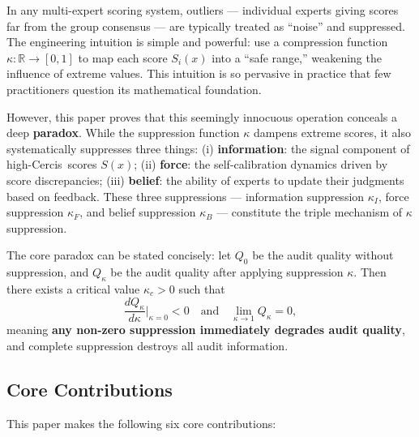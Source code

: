 \documentclass[12pt,a4paper]{article}
\theoremstyle{definition}
\newcommand{\R}{\mathbb{R}}
\newcommand{\Cercis}{\textsf{Cercis}}
\begin{document}
In any multi-expert scoring system, outliers --- individual experts giving scores far from the group consensus --- are typically treated as ``noise'' and suppressed. The engineering intuition is simple and powerful: use a compression function $\kappa: \R \to [0,1]$ to map each score $S_i(x)$ into a ``safe range,'' weakening the influence of extreme values. This intuition is so pervasive in practice that few practitioners question its mathematical foundation.

However, this paper proves that this seemingly innocuous operation conceals a deep \textbf{paradox}. While the suppression function $\kappa$ dampens extreme scores, it also systematically suppresses three things: (i) \textbf{information}: the signal component of high-\Cercis~scores $S(x)$; (ii) \textbf{force}: the self-calibration dynamics driven by score discrepancies; (iii) \textbf{belief}: the ability of experts to update their judgments based on feedback. These three suppressions --- information suppression $\kappa_I$, force suppression $\kappa_F$, and belief suppression $\kappa_B$ --- constitute the triple mechanism of $\kappa$ suppression.

The core paradox can be stated concisely: let $Q_0$ be the audit quality without suppression, and $Q_\kappa$ be the audit quality after applying suppression $\kappa$. Then there exists a critical value $\kappa_c > 0$ such that
\begin{equation}
    \frac{d Q_\kappa}{d\kappa}\bigg|_{\kappa=0} < 0 \quad \text{and} \quad \lim_{\kappa \to 1} Q_\kappa = 0,
\end{equation}
meaning \textbf{any non-zero suppression immediately degrades audit quality}, and complete suppression destroys all audit information.

\subsection{Core Contributions}
\label{sec:contrib}

This paper makes the following six core contributions:
\end{document}
